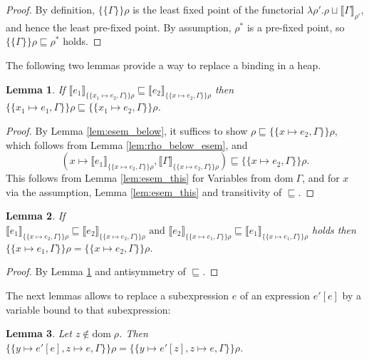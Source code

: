 \documentclass{scrartcl}
\newtheorem{lemma}{Lemma}
\theoremstyle{nonumberbreak}
\newtheorem{proof}{Proof}
\newcommand{\dom}[1]{\text{dom}\;#1}
\newcommand{\dsem}[2]{\llbracket #1 \rrbracket_{#2}}
\newcommand{\esem}[1]{\{\!\!\!\{#1\}\!\!\!\}}
\begin{document}
\begin{proof}
By definition, $\esem{\Gamma}\rho$ is the least fixed point of the functorial $\lambda \rho'. \rho \sqcup \dsem{\Gamma}{\rho'}$, and hence the least pre-fixed point. By assumption, $\rho^*$ is a pre-fixed point, so $\esem{\Gamma}\rho \sqsubseteq \rho^*$ holds.
\end{proof}

The following two lemmas provide a way to replace a binding in a heap.
\begin{lemma}
If $\dsem{e_1}{\esem{x_1 \mapsto e_2, \Gamma}\rho} \sqsubseteq \dsem{e_2}{\esem{x \mapsto e_2, \Gamma}\rho}$
then $\esem{x_1 \mapsto e_1, \Gamma}\rho \sqsubseteq \esem{x_1 \mapsto e_2, \Gamma}\rho$.
\label{lem:esem_subst_expr_below}
\end{lemma}

\begin{proof}
By Lemma \ref{lem:esem_below}, it suffices to show $\rho \sqsubseteq \esem{x \mapsto e_2, \Gamma}\rho$, which follows from  Lemma \ref{lem:rho_below_esem}, and 
\[
(x \mapsto \dsem{e_1}{\esem{x \mapsto e_2, \Gamma}\rho}, \dsem{\Gamma}{\esem{x \mapsto e_2, \Gamma}\rho}) \sqsubseteq \esem{x \mapsto e_2, \Gamma}\rho.
\]
This follows from Lemma \ref{lem:esem_this} for Variables from $\dom\Gamma$, and for $x$ via the assumption, Lemma \ref{lem:esem_this} and transitivity of $\sqsubseteq$.
\end{proof}

\begin{lemma}
If
$\dsem{e_1}{\esem{x \mapsto e_2, \Gamma}\rho} \sqsubseteq \dsem{e_2}{\esem{x \mapsto e_2, \Gamma}\rho}
\text{ and }
\dsem{e_2}{\esem{x \mapsto e_1, \Gamma}\rho} \sqsubseteq \dsem{e_1}{\esem{x \mapsto e_1, \Gamma}\rho}
$
holds then $\esem{x \mapsto e_1, \Gamma}\rho = \esem{x \mapsto e_2, \Gamma}\rho$.
\label{lem:esem_subst_expr}
\end{lemma}

\begin{proof}
By Lemma \ref{lem:esem_subst_expr_below} and antisymmetry of $\sqsubseteq$.
\end{proof}

The next lemmas allows to replace a subexpression $e$ of an expression $e'[e]$ by a variable bound to that subexpression:

\begin{lemma}
Let $z \notin \dom \rho$. Then $\esem{y \mapsto e'[e], z \mapsto e, \Gamma}\rho = \esem{y \mapsto e'[z], z \mapsto e, \Gamma}\rho$.
\label{lem:exp_var_subst}
\label{lem:var_var_subst}
\end{lemma}
\end{document}
